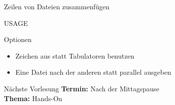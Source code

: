 \documentclass[aspectratio=43]{beamer}
\begin{document}
\begin{frame} 
	\begin{block}{} 
        Zeilen von Dateien zusammenfügen
	\end{block}
	\begin{block}{USAGE} 
	\end{block}
	\begin{exampleblock}{Optionen} 
	\begin{itemize}
	\item {} \newline Zeichen aus  statt Tabulatoren benutzen
	\item {} \newline Eine Datei nach der anderen statt parallel ausgeben
	\end{itemize}
	\end{exampleblock}
\end{frame}


\begin{frame}[plain]
\begin{alertblock}{Nächste Vorlesung}
\textbf{Termin:} Nach der Mittagspause\\
\textbf{Thema:} Hands-On\\
\end{alertblock}
\end{frame}

\materialframe
\end{document}
